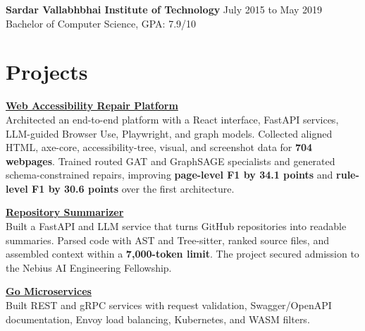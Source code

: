 \documentclass[a4paper,10pt]{article}
\newcommand{\project}[2]{
  \needspace{4\baselineskip}
  \textbf{\color{accent}#1}\\[-1pt]
  {\small #2}
}
\begin{document}
\vspace{2pt}
\textbf{\color{accent}Sardar Vallabhbhai Institute of Technology} \hfill July 2015 to May 2019\\[-1pt]
Bachelor of Computer Science, GPA: 7.9/10

\section{Projects}
\project{\href{https://github.com/aymanapatel/rl-a11y}{Web Accessibility Repair Platform}}{Architected an end-to-end platform with a React interface, FastAPI services, LLM-guided Browser Use, Playwright, and graph models. Collected aligned HTML, axe-core, accessibility-tree, visual, and screenshot data for \textbf{704 webpages}. Trained routed GAT and GraphSAGE specialists and generated schema-constrained repairs, improving \textbf{page-level F1 by 34.1 points} and \textbf{rule-level F1 by 30.6 points} over the first architecture.}

\vspace{2pt}
\project{\href{https://github.com/aymanapatel/nebius-project}{Repository Summarizer}}{Built a FastAPI and LLM service that turns GitHub repositories into readable summaries. Parsed code with AST and Tree-sitter, ranked source files, and assembled context within a \textbf{7,000-token limit}. The project secured admission to the Nebius AI Engineering Fellowship.}

\vspace{2pt}
\project{\href{https://github.com/aymanapatel/golang-microservices}{Go Microservices}}{Built REST and gRPC services with request validation, Swagger/OpenAPI documentation, Envoy load balancing, Kubernetes, and WASM filters.}
\end{document}
